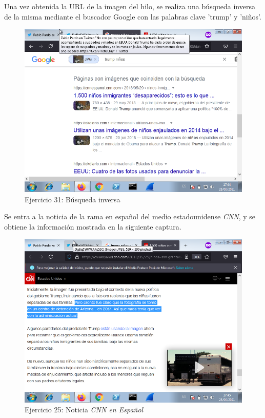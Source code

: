 \documentclass[11pt]{article}
\begin{document}
Una vez obtenida la URL de la imagen del hilo, se realiza una búsqueda inversa de la misma mediante el buscador Google con las palabras clave 'trump' y 'niños'.

\begin{figure}[H]
    \caption{Ejercicio 31: Búsqueda inversa}
  \centering
    \includegraphics[scale=0.8]{p05/e31-2.png}
\end{figure}

Se entra a la noticia de la rama en español del medio estadounidense \textit{CNN}, y se obtiene la información mostrada en la siguiente captura.

\begin{figure}[H]
    \caption{Ejercicio 25: Noticia \textit{CNN en Español}}
  \centering
    \includegraphics[scale=0.8]{p05/e31-3.png}
\end{figure}
\end{document}
